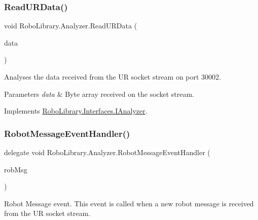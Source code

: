 \hypertarget{class_robo_library_1_1_analyzer_a61fcaef4370cb9a47b12d7cdaf926768}{}\label{class_robo_library_1_1_analyzer_a61fcaef4370cb9a47b12d7cdaf926768} 
\subsubsection{\texorpdfstring{Read\+U\+R\+Data()}{ReadURData()}}
{\footnotesize\ttfamily void Robo\+Library.\+Analyzer.\+Read\+U\+R\+Data (\begin{DoxyParamCaption}\item[{byte \mbox{[}$\,$\mbox{]}}]{data }\end{DoxyParamCaption})}



Analyses the data received from the UR socket stream on port 30002.


\begin{DoxyParams}{Parameters}
{\em data} & Byte array received on the socket stream.\\
\hline
\end{DoxyParams}


Implements \hyperlink{interface_robo_library_1_1_interfaces_1_1_i_analyzer}{Robo\+Library.\+Interfaces.\+I\+Analyzer}.

\hypertarget{class_robo_library_1_1_analyzer_a985396dd045b907a73d7b627b9bd07dc}{}\label{class_robo_library_1_1_analyzer_a985396dd045b907a73d7b627b9bd07dc} 
\subsubsection{\texorpdfstring{Robot\+Message\+Event\+Handler()}{RobotMessageEventHandler()}}
{\footnotesize\ttfamily delegate void Robo\+Library.\+Analyzer.\+Robot\+Message\+Event\+Handler (\begin{DoxyParamCaption}\item[{Robot\+Message}]{rob\+Msg }\end{DoxyParamCaption})}



Robot Message event. This event is called when a new robot message is received from the UR socket stream.

